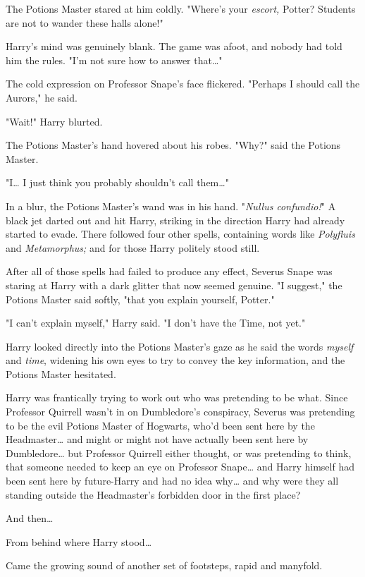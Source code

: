 The Potions Master stared at him coldly. "Where's your \emph{escort,} Potter? 
Students are not to wander these halls alone!"

Harry's mind was genuinely blank. The game was afoot, and nobody had told him 
the rules. "I'm not sure how to answer that{\ldots}"

The cold expression on Professor Snape's face flickered. "Perhaps I should call 
the Aurors," he said.

"Wait!" Harry blurted.

The Potions Master's hand hovered about his robes. "Why?" said the Potions 
Master.

"I{\ldots} I just think you probably shouldn't call them{\ldots}"

In a blur, the Potions Master's wand was in his hand. "\emph{Nullus 
confundio!}" A black jet darted out and hit Harry, striking in the direction 
Harry had already started to evade. There followed four other spells, 
containing words like \emph{Polyfluis} and \emph{Metamorphus;} and for those 
Harry politely stood still.

After all of those spells had failed to produce any effect, Severus Snape was 
staring at Harry with a dark glitter that now seemed genuine. "I suggest," the 
Potions Master said softly, "that you explain yourself, Potter."

"I can't explain myself," Harry said. "I don't have the Time, not yet."

Harry looked directly into the Potions Master's gaze as he said the words 
\emph{myself} and \emph{time}, widening his own eyes to try to convey the key 
information, and the Potions Master hesitated.

Harry was frantically trying to work out who was pretending to be what. Since 
Professor Quirrell wasn't in on Dumbledore's conspiracy, Severus was pretending 
to be the evil Potions Master of Hogwarts, who'd been sent here by the 
Headmaster{\ldots} and might or might not have actually been sent here by 
Dumbledore{\ldots} but Professor Quirrell either thought, or was pretending to 
think, that someone needed to keep an eye on Professor Snape{\ldots} and Harry 
himself had been sent here by future-Harry and had no idea why{\ldots} and why 
were they all standing outside the Headmaster's forbidden door in the first 
place?

And then{\ldots}

From behind where Harry stood{\ldots}

Came the growing sound of another set of footsteps, rapid and manyfold.

